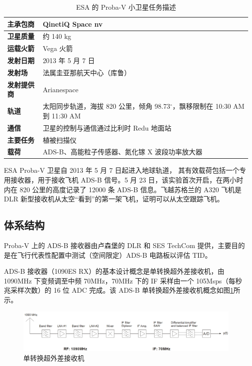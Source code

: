 \renewcommand\arraystretch{1.5}
\begin{table}[!htb]
\centering
\caption{ESA 的 Proba-V 小卫星任务描述}
\label{tab:esa_Proba-V_mission}
\begin{tabular}[b]{|p{2.5cm}<{\raggedleft}|p{12cm}<{\raggedright}|}
\hline
\textbf{主承包商} & QinetiQ Space nv \\
\hline
\textbf{卫星质量} & 约 140 kg\\
\hline
\textbf{运载火箭 }& Vega 火箭\\
\hline
\textbf{发射日期} & 2013 年 5 月 7 日 \\
\hline
\textbf{发射场} & 法属圭亚那航天中心（库鲁）\\
\hline
\textbf{发射提供商} & Arianespace \\
\hline
\textbf{轨道} & 太阳同步轨道，海拔 820 公里，倾角 98.73$^\circ$，飘移限制在 10:30 AM 到 11:30 AM  \\
\hline
\textbf{通信} & 卫星的控制与通信通过比利时 Redu 地面站 \\
\hline
\textbf{主要任务} & 植被扫描仪 \\
\hline
\textbf{载荷} & ADS-B、高能粒子传感器、氮化镓 X 波段功率放大器 \\
\hline
\end{tabular}
\end{table}

ESA Proba-V 卫星自 2013 年 5 月 7 日起进入地球轨道， 其有效载荷包括一个专用接收器，用于接收飞机 ADS-B 信号。5 月 23 日，该实验首次开启，在两小时内在 820 公里的高度记录了 12000 条 ADS-B 信息。飞越苏格兰的 A320 飞机是 DLR 新型接收机从太空“看到”的第一架飞机，证明可以从太空跟踪飞机。


\subsection{体系结构}

Proba-V 上的 ADS-B 接收器由卢森堡的 DLR 和 SES TechCom 提供，主要目的是在飞行代表性配置中测试（空间限定）ADS-B 电路板以评估 \acs{TID}。

ADS-B 接收器（1090ES RX）的基本设计概念是单转换超外差接收机，由 1090MHz 下变频调至中频 70MHz，70MHz 下的 \acs{IF} 采样由一个 105Msps（每秒兆采样次数）的 16 位 \acs{ADC} 完成。该 ADS-B 单转换超外差接收机概念如图\ref{fig:dlr_ads-b_receiver}所示。

\begin{figure}[!htb]
\centering
\includegraphics[width=15cm]{pic/dlr_ads-b_receiver.png}
\caption{单转换超外差接收机\protect\footnotemark}
\label{fig:dlr_ads-b_receiver}
\end{figure}

